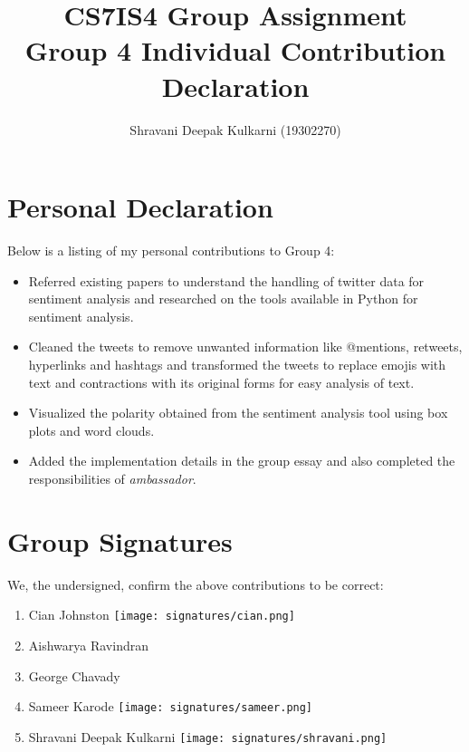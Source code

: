 \documentclass[a4paper,10pt]{article}
\begin{document}
\title{
    CS7IS4 Group Assignment \\
    \large Group 4 Individual Contribution Declaration
}
\author{
    Shravani Deepak Kulkarni (19302270)
}

\maketitle

\section{Personal Declaration}

Below is a listing of my personal contributions to Group 4:

\begin{itemize}
    \item{
    	Referred existing papers to understand the handling of twitter data for sentiment analysis and researched on the tools available in Python for sentiment analysis.
    }
    \item{
    	Cleaned the tweets to remove unwanted information like @mentions, retweets, hyperlinks and hashtags and transformed the tweets to replace emojis with text and contractions with its original forms for easy analysis of text.
	}
    \item{
    	Visualized the polarity obtained from the sentiment analysis tool using box plots and word clouds.
    }
    \item{
    	Added the implementation details in the group essay and also completed the responsibilities of \textit{ambassador}.
    }
    
\end{itemize}

\section{Group Signatures}

We, the undersigned, confirm the above contributions to be correct:

\begin{enumerate}
    \item{
        Cian Johnston \texttt{[image: signatures/cian.png]}
    }
    \item{
        Aishwarya Ravindran
    }
    \item{
        George Chavady 
    }
    \item{
        Sameer Karode \texttt{[image: signatures/sameer.png]}
    }
    \item{
        Shravani Deepak Kulkarni \texttt{[image: signatures/shravani.png]}
    }

\end{enumerate}
\end{document}
